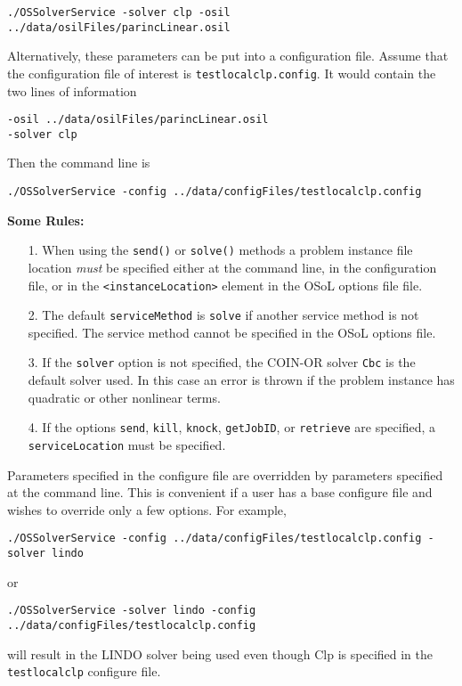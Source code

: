 \documentclass[11pt]{article}
\renewcommand{\_}{{\char"5F}}
\renewcommand{\{}{{\char"7B}}
\renewcommand{\}}{{\char"7D}}
\renewcommand{\^}{{\char"0D}}
\renewcommand{\'}{{\char"0D}}
\begin{document}
\begin{verbatim}
./OSSolverService -solver clp -osil ../data/osilFiles/parincLinear.osil
\end{verbatim}

Alternatively, these parameters can be put into a configuration file. Assume that the configuration file of interest is {\tt testlocalclp.config}. It would contain the two lines of information
\begin{verbatim}
-osil ../data/osilFiles/parincLinear.osil
-solver clp
\end{verbatim}
Then the command line is
\begin{verbatim}
./OSSolverService -config ../data/configFiles/testlocalclp.config
\end{verbatim}


{\bf Some Rules:}

\begin{itemize}
\item[1.]  When using the {\tt send()} or  {\tt solve()} methods a problem instance file location {\it must} be specified either at  the command line, in the configuration file, or in the {\tt <instanceLocation>} element in the OSoL options file file.

\item[2.]  The default {\tt serviceMethod} is {\tt solve} if another service method is not specified.   The service method cannot be specified in the OSoL options file.

\item [3.]  If the {\tt solver} option is not specified, the COIN-OR solver {\tt Cbc} is the default solver used. In this case an error is thrown if the problem instance has quadratic or other nonlinear terms.

\item[4.]  If the options {\tt send}, {\tt kill}, {\tt knock},  {\tt getJobID},  or {\tt retrieve} are specified, a  {\tt serviceLocation} must be specified.

\end{itemize}



Parameters specified in the configure file are overridden by parameters specified at the command line. This is convenient if a user has a base configure file and wishes to override only a few options. For example,
\begin{verbatim}
./OSSolverService -config ../data/configFiles/testlocalclp.config -solver lindo
\end{verbatim}
or
\begin{verbatim}
./OSSolverService -solver lindo -config ../data/configFiles/testlocalclp.config
\end{verbatim}
will result in the LINDO solver being used even though Clp is specified in the {\tt testlocalclp} configure file.
\end{document}
